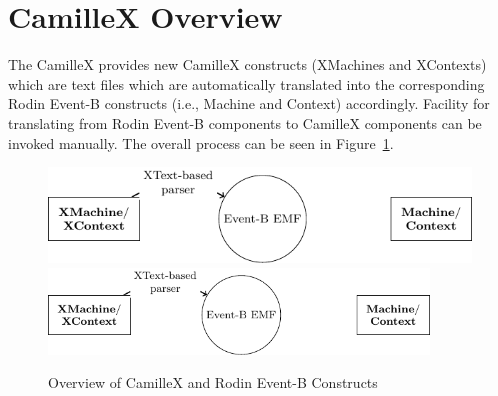 \section{CamilleX Overview}
\label{sec:overview}

The CamilleX provides new CamilleX constructs (XMachines and XContexts) which are text files which are automatically translated into the corresponding Rodin Event-B constructs (i.e., Machine and Context) accordingly.  Facility for translating from Rodin Event-B components to CamilleX components can be invoked manually. The overall process can be seen in Figure~\ref{fig:overview}.
\begin{figure}[!htbp]
  \centering
  \ifplastex
  \includegraphics[width=512]{tikz-overview}
  \else
  \includegraphics[width=0.9\textwidth]{tikz-overview}
  \fi
  \caption{Overview of CamilleX and Rodin Event-B Constructs}
  \label{fig:overview}
\end{figure}

